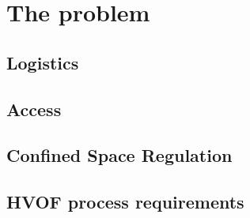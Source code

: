 \section{The problem}


\subsection{Logistics}

\subsection{Access}

\subsection{Confined Space Regulation}

\subsection{HVOF process requirements}